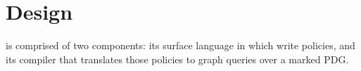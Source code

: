 \chapter{Design}
\label{sec:design}

\syslang{} is comprised of two components: its surface language in which \ces{} write policies,
and its compiler that translates those policies to graph queries over a marked PDG.



